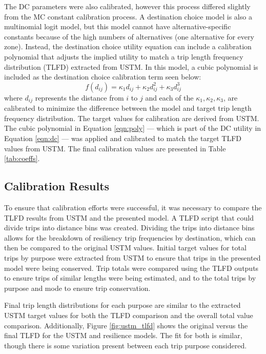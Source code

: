 The DC parameters were also calibrated, however this process differed slightly
from the MC constant calibration process. A destination choice model is also a
multinomial logit model, but this model cannot have alternative-specific
constants because of the high numbers of alternatives (one alternative for
every zone). Instead, the destination choice utility equation can include a
calibration polynomial that adjusts the implied utility to match a trip length
frequency distribution (TLFD) extracted from USTM. In this model, a
cubic polynomial  is included as the destination choice calibration term seen below:
\begin{equation}
  f(d_{ij}) = \kappa_1 d_{ij} + \kappa_2 d_{ij}^2 + \kappa_3 d_{ij}^3
	\label{eqn:poly}
\end{equation}
where $d_{ij}$ represents the distance from $i$ to $j$
and each of the  $\kappa_1,\kappa_2,\kappa_3$, are calibrated to minimize the
difference between the model and target trip length frequency distribution. The target
values for calibration are derived from USTM. The cubic polynomial in
Equation \ref{eqn:poly} --- which is part of the DC utility in
Equation \ref{eqn:dc} --- was applied and calibrated to match the target TLFD
values from USTM. The final calibration values are presented in Table
\ref{tab:coeffs}.

\subsection{Calibration Results}

To ensure that calibration efforts were successful, it was necessary to
compare the TLFD results from USTM and the presented model. A
TLFD script that could divide trips
into distance bins was created. Dividing the trips into distance bins allows for the
breakdown of resiliency trip frequencies by destination, which can then be
compared to the original USTM values. Initial target values for total
trips by purpose were extracted from USTM to ensure that trips in
the presented model were being conserved. Trip totals were compared using
the TLFD outputs to ensure trips of similar lengths were being estimated,
and to the total trips by purpose and mode to ensure trip conservation.

Final trip length distributions for each purpose are similar to the
extracted USTM target values for both the TLFD comparison and the overall
total value comparison. Additionally, Figure \ref{fig:ustm_tlfd} shows the original versus the final
TLFD for the USTM and resilience models. The fit for both is similar, though
there is some variation present between each trip purpose considered.

